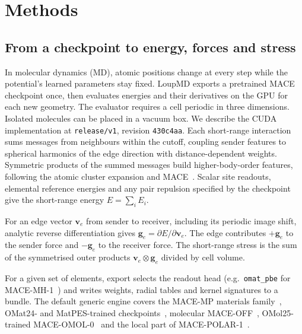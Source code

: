 \section{Methods}
\label{sec:methods}

\subsection{From a checkpoint to energy, forces and stress}
In molecular dynamics (MD), atomic positions change at every step while the potential's learned parameters stay fixed. LoupMD exports a pretrained MACE checkpoint once, then evaluates energies and their derivatives on the GPU for each new geometry. The evaluator requires a cell periodic in three dimensions. Isolated molecules can be placed in a vacuum box. We describe the CUDA implementation at \texttt{release/v1}, revision \texttt{430c4aa}. Each short-range interaction sums messages from neighbours within the cutoff, coupling sender features to spherical harmonics of the edge direction with distance-dependent weights. Symmetric products of the summed messages build higher-body-order features, following the atomic cluster expansion and MACE~\cite{drautz2019ace,batatia2022mace}. Scalar site readouts, elemental reference energies and any pair repulsion specified by the checkpoint give the short-range energy $E=\sum_i E_i$.

For an edge vector $\mathbf v_e$ from sender to receiver, including its periodic image shift, analytic reverse differentiation gives $\mathbf g_e=\partial E/\partial\mathbf v_e$. The edge contributes $+\mathbf g_e$ to the sender force and $-\mathbf g_e$ to the receiver force. The short-range stress is the sum of the symmetrised outer products $\mathbf v_e\otimes\mathbf g_e$ divided by cell volume.

For a given set of elements, export selects the readout head (e.g.\ \texttt{omat\_pbe} for MACE-MH-1~\cite{batatia2025mh1}) and writes weights, radial tables and kernel signatures to a bundle. The default generic engine covers the MACE-MP materials family~\cite{batatia2025materials}, OMat24- and MatPES-trained checkpoints~\cite{barrosoluque2024omat,kaplan2025matpes}, molecular MACE-OFF~\cite{kovacs2025maceoff}, OMol25-trained MACE-OMOL-0~\cite{levine2025omol} and the local part of MACE-POLAR-1~\cite{batatia2026polar}.

